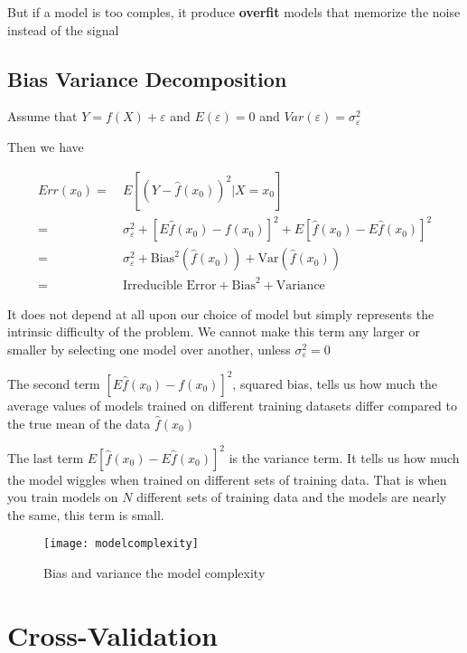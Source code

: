 But if a model is too comples, it produce \textbf{overfit} models that memorize the noise instead of the signal


\subsection{Bias Variance Decomposition}

Assume that $Y = f(X) + \varepsilon$ and $E(\varepsilon) = 0$ and $Var(\varepsilon) = \sigma^2_\varepsilon$

Then we have

\begin{equation}
  \begin{split}
     Err(x_0) =  & \: E[(Y- \hat{f}(x_0))^2 | X = x_0] \\
       =& \: \sigma^2_\varepsilon + [E \hat{f}(x_0) - f(x_0)]^2 + E[\hat{f}(x_0) - E\hat{f}(x_0)]^2 \\
       =& \: \sigma_\varepsilon^2 + \text{Bias}^2 (\hat{f}(x_0)) + \text{Var}(\hat{f}(x_0)) \\
       =& \: \text{Irreducible Error} + \text{Bias}^2 + \text{Variance}
  \end{split}
\end{equation}

It does not depend at all upon our choice of model
but simply represents the intrinsic difficulty of the problem. We cannot make this term any larger or smaller by selecting one model over another, unless $\sigma_\varepsilon^2 = 0$

The second term $ [E \hat{f}(x_0) - f(x_0)]^2 $, squared bias, tells us how much the average values of models trained on different training datasets differ compared to the true mean of the data $\hat{f}(x_0)$

The last term $E[\hat{f}(x_0) - E\hat{f}(x_0)]^2$ is the variance term. It tells us how much the model wiggles when trained on different sets of training data. That is when you train models on $N$ different sets of training data and the models are nearly the same, this term is small.

\begin{figure}[H]
  \centering
  \texttt{[image: modelcomplexity]}
  \caption{Bias and variance the model complexity}\label{fig:modelcomplexity}
\end{figure}

\section{Cross-Validation}

